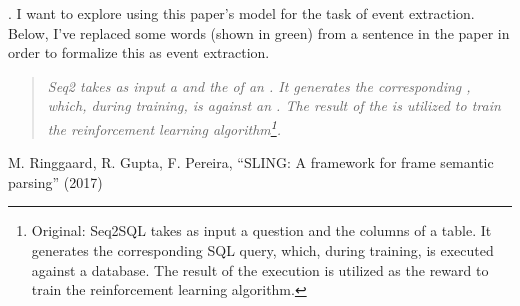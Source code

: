 \documentclass[11pt]{article}
\begin{document}
\myspace
\p {}. I want to explore using this paper's model for the task of event extraction. Below, I've replaced some words (shown in green) from a sentence in the paper in order to formalize this as event extraction.
\begin{quote}
	{
		\itshape Seq2 takes as input a  and the  of an . It generates the corresponding , which, during training, is  against an . The result of the  is utilized to train the reinforcement learning algorithm\footnote{Original: Seq2SQL takes as input a question and the columns of a table. It generates the corresponding SQL query, which, during training, is executed against a database. The result of the execution is utilized as the reward to train the reinforcement learning algorithm.}.
	}
\end{quote}






\vspace{-1em}
{\footnotesize M. Ringgaard, R. Gupta, F. Pereira, ``SLING: A framework for frame semantic parsing'' (2017)}

\end{document}
